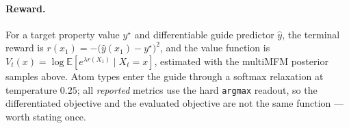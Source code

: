 \documentclass[11pt]{article}
\begin{document}
\paragraph{Reward.} For a target property value $y^{\star}$ and differentiable
guide predictor $\hat y$, the terminal reward is
$r(x_1)=-\big(\hat y(x_1)-y^{\star}\big)^2$, and the value function is
$V_t(x)=\log\mathbb{E}\!\left[e^{\lambda r(X_1)}\mid X_t=x\right]$, estimated with
the multiMFM posterior samples above. Atom types enter the guide through a
softmax relaxation at temperature $0.25$; all \emph{reported} metrics use the hard
\texttt{argmax} readout, so the differentiated objective and the evaluated
objective are not the same function --- worth stating once.
\end{document}
